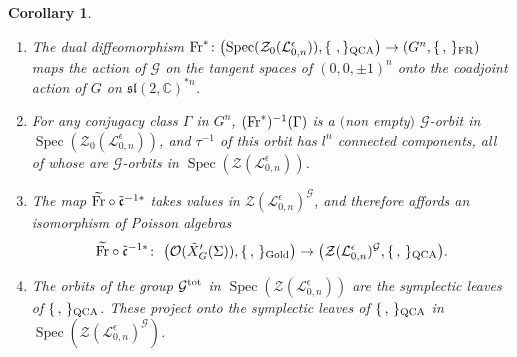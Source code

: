\documentclass[pdftex]{sigma}%
\numberwithin{equation}{section}
\numberwithin{figure}{section}
\newtheorem{cor}[teo]{Corollary}
\newcommand{\e}{\epsilon}
\newcommand{\mc}{\mathbb{C}}
\newcommand{\Gg}{{\mathcal G}}
\newcommand{\Ll}{{\mathcal L}}
\newcommand{\ra}{\rightarrow}
\begin{document}
\begin{cor} \label{equivcor} \quad

\begin{enumerate}\itemsep=0pt
\item[$(1)$] The dual diffeomorphism ${\rm Fr}^*\colon \big(\!\operatorname{Spec}(\mathcal{Z}_0(\Ll_{0,n}^\epsilon)),\{\ ,\}_{\rm QCA}\big)\ra (G^{n},\{\, ,\, \}_{\rm FR})$ maps the action of $\Gg$ on the tangent spaces of $(0,0,\pm 1)^n$ onto the coadjoint action of $G$ on ${\mathfrak{sl}}(2,\mc)^{*n}$.

\item[$(2)$] {\sloppy For any conjugacy class $\Gamma$ in $G^n$, $({\rm Fr}^*)^{-1}(\Gamma)$ is a $($non empty$)$ $\Gg$-orbit in $\operatorname{Spec}(\mathcal{Z}_0(\Ll_{0,n}^\epsilon))$, and $\tau^{-1}$ of this orbit has $l^n$ connected components, all of whose are $\Gg$-orbits in $\operatorname{Spec}(\mathcal{Z}(\Ll_{0,n}^\epsilon))$.

 }

\item[$(3)$] The map $\widetilde{\rm Fr} \circ \tilde{\mathfrak{c}}^{-1*}$ takes values in $\mathcal{Z}(\Ll_{0,n}^\epsilon)^{\mathcal{G}}$, and therefore affords an isomorphism of Poisson algebras
\[
\widetilde{\rm Fr} \circ \tilde{\mathfrak{c}}^{-1*}\colon\ \big(\mathcal{O}(\tilde X_G'(\Sigma)),\{\, ,\, \}_{\rm Gold}\big) \ra \big(\mathcal{Z}(\Ll_{0,n}^\epsilon)^{\mathcal{G}},\{\, ,\, \}_{\rm QCA}\big).
\]

\item[$(4)$] The orbits of the group $\Gg^{\rm tot}$ in $\operatorname{Spec}(\mathcal{Z}(\Ll_{0,n}^\e))$ are the symplectic leaves of $\{\, ,\, \}_{\rm QCA}$. These project onto the symplectic leaves of $\{\, ,\, \}_{\rm QCA}$ in $\operatorname{Spec}(\mathcal{Z}(\Ll_{0,n}^\e)^{\mathcal{G}})$.

\end{enumerate}
\end{cor}
\end{document}
